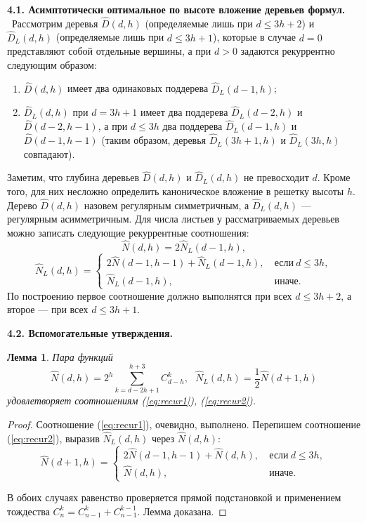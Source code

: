 \documentclass[12pt, a4paper]{article}
\theoremstyle{plain}
\newtheorem{lemma}{Лемма}
\theoremstyle{definition}
\theoremstyle{definition}
\newcommand{\Sum}{\displaystyle\sum\limits}
\renewcommand{\le}{\leqslant}
\renewcommand{\hat}{\widehat}
\begin{document}
{\bfseries 4.1. Асимптотически оптимальное по высоте вложение  деревьев формул.} \ 
Рассмотрим деревья $\hat{D}(d,h)$ (определяемые лишь при $d \le 3h+2$)
и $\hat{D}_L(d,h)$ (определяемые лишь при $d \le 3h+1$),
которые в случае $d = 0$ представляют собой отдельные вершины, а при $d > 0$ задаются рекуррентно следующим образом:
\begin{enumerate}[label={\arabic*)}]
\item $\hat{D}(d,h)$ имеет два одинаковых поддерева $\hat{D}_L(d-1,h)$;
\item $\hat{D}_L(d,h)$ при $d = 3h + 1$ имеет два поддерева
$\hat{D}_L(d-2,h)$ и $\hat{D}(d-2,h-1)$,
а при $d \le 3h$ два поддерева $\hat{D}_L(d-1,h)$ и $\hat{D}(d-1,h-1)$
(таким образом, деревья $\hat{D}_L(3h + 1, h)$ и $\hat{D}_L(3h, h)$ совпадают).
\end{enumerate}
Заметим, что глубина деревьев $\hat{D}(d,h)$ и $\hat{D}_L(d,h)$ 
не превосходит $d$. Кроме того, для них 
 несложно определить каноническое 
 вложение в решетку высоты $h$. Дерево $\hat{D}(d,h)$ назовем регулярным симметричным, а $\hat{D}_L(d,h)$ --- регулярным асимметричным.
Для числа листьев у рассматриваемых деревьев можно
записать следующие рекуррентные соотношения:
\begin{equation}
\label{eq:recur1}
\hat{N}(d,h) = 2\hat{N}_L(d-1,h),
\end{equation}
\begin{equation}
\label{eq:recur2}
\hat{N}_L(d,h) = 
\begin{cases}
	2\hat{N}(d-1,h-1) + \hat{N}_L(d-1,h),&~\text{если}~d \le 3h,\\
	\hat{N}_L(d-1,h),&~\text{иначе.}
\end{cases}
\end{equation}
По построению первое соотношение должно выполнятся при всех $d \le 3h + 2$,
а второе --- при всех $d \le 3h + 1$.

\smallskip

{\bfseries 4.2. Вспомогательные утверждения.} \
\begin{lemma}
Пара функций 
\begin{equation}
\label{eq:hatN}
\hat{N}(d,h) =2^h\Sum_{k=d-2h+1}^{h+3}C_{d-h}^k
,~~~\hat{N}_L(d,h) = \frac{1}{2}\hat{N}(d+1,h)
\end{equation}
удовлетворяет соотношениям \textnormal{(\ref{eq:recur1})}\textup{,} \textnormal{(\ref{eq:recur2})}.
\end{lemma} 

\begin{proof}
Соотношение (\ref{eq:recur1}), очевидно, выполнено. 
Перепишем соотношение (\ref{eq:recur2}), выразив $\hat{N}_L(d,h)$ через $\hat{N}(d,h)$:
\[
\hat{N}(d+1,h) = 
\begin{cases}
	2\hat{N}(d-1,h-1) + \hat{N}(d,h),&~\text{если}~d \le 3h,\\
	\hat{N}(d,h),&~\text{иначе.}
\end{cases}
\]

В обоих случаях равенство проверяется прямой подстановкой и 
применением тождества $C_{n}^k = C_{n-1}^k + C_{n-1}^{k-1}$.
Лемма доказана.
\end{proof}
\end{document}
